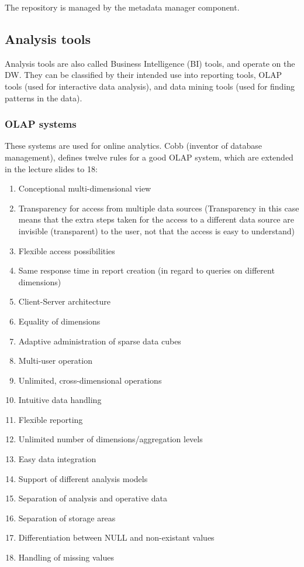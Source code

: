 \documentclass{article}
\begin{document}
The repository is managed by the metadata manager component.

\subsection{Analysis tools}
Analysis tools are also called Business Intelligence (BI) tools, and operate on the DW.
They can be classified by their intended use into reporting tools, OLAP tools (used for interactive data analysis), and data mining tools (used for finding patterns in the data).

\subsubsection{OLAP systems}
These systems are used for online analytics.
Cobb (inventor of database management), defines twelve rules for a good OLAP system, which are extended in the lecture slides to 18:
\begin{enumerate}
    \item Conceptional multi-dimensional view
    \item Transparency for access from multiple data sources (Transparency in this case means that the extra steps taken for the access to a different data source are invisible (transparent) to the user, not that the access is easy to understand)
    \item Flexible access possibilities
    \item Same response time in report creation (in regard to queries on different dimensions)
    \item Client-Server architecture
    \item Equality of dimensions
    \item Adaptive administration of sparse data cubes
    \item Multi-user operation
    \item Unlimited, cross-dimensional operations
    \item Intuitive data handling
    \item Flexible reporting
    \item Unlimited number of dimensions/aggregation levels
    \item Easy data integration
    \item Support of different analysis models
    \item Separation of analysis and operative data
    \item Separation of storage areas
    \item Differentiation between NULL and non-existant values
    \item Handling of missing values
\end{enumerate}
\end{document}
